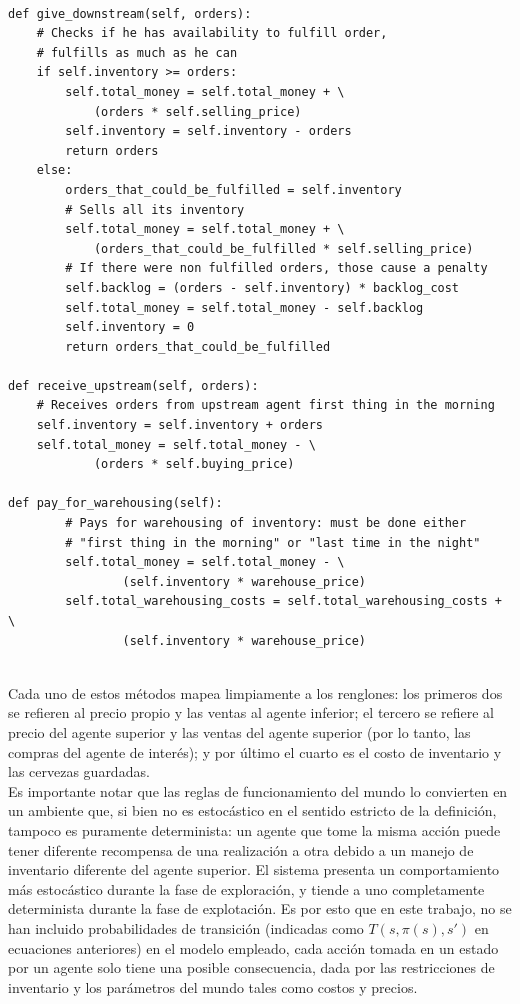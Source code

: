 \begin{verbatim}

def give_downstream(self, orders):
    # Checks if he has availability to fulfill order,
    # fulfills as much as he can
    if self.inventory >= orders:
        self.total_money = self.total_money + \
            (orders * self.selling_price)
        self.inventory = self.inventory - orders
        return orders
    else:
        orders_that_could_be_fulfilled = self.inventory
        # Sells all its inventory
        self.total_money = self.total_money + \
            (orders_that_could_be_fulfilled * self.selling_price)
        # If there were non fulfilled orders, those cause a penalty
        self.backlog = (orders - self.inventory) * backlog_cost
        self.total_money = self.total_money - self.backlog
        self.inventory = 0
        return orders_that_could_be_fulfilled

def receive_upstream(self, orders):
    # Receives orders from upstream agent first thing in the morning
    self.inventory = self.inventory + orders
    self.total_money = self.total_money - \
            (orders * self.buying_price)
     
def pay_for_warehousing(self):
        # Pays for warehousing of inventory: must be done either
        # "first thing in the morning" or "last time in the night"
        self.total_money = self.total_money - \
                (self.inventory * warehouse_price)
        self.total_warehousing_costs = self.total_warehousing_costs + \
                (self.inventory * warehouse_price)
                
\end{verbatim}

Cada uno de estos m\'etodos mapea limpiamente a los renglones: los primeros dos se refieren al precio propio y las ventas al agente inferior; el tercero se refiere al precio del agente superior y las ventas del agente superior (por lo tanto, las compras del agente de inter\'es); y por \'ultimo el cuarto es el costo de inventario y las cervezas guardadas.\\

Es importante notar que las reglas de funcionamiento del mundo lo convierten en un ambiente que, si bien no es estoc\'astico en el sentido estricto de la definici\'on, tampoco es puramente determinista: un agente que tome la misma acci\'on puede tener diferente recompensa de una realizaci\'on a otra debido a un manejo de inventario diferente del agente superior. El sistema  presenta un comportamiento m\'as estoc\'astico durante la fase de exploraci\'on, y tiende a uno completamente determinista durante la fase de explotaci\'on. Es por esto que en este trabajo, no se han incluido probabilidades de transici\'on (indicadas como $T(s, \pi(s), s')$ en ecuaciones anteriores) en el modelo empleado, cada acci\'on tomada en un estado por un agente solo tiene una posible consecuencia, dada por las restricciones de inventario y los par\'ametros del mundo tales como costos y precios.\\

